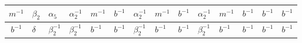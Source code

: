 \documentclass{llncs}
\begin{document}
\begin{table}[h]
\begin{center}
\begin{tabular}{|c|p{0.7cm}|p{0.7cm}|p{0.7cm}|p{0.7cm}|p{0.7cm}|p{0.7cm}|p{0.7cm}|p{0.7cm}|p{0.7cm}|p{0.7cm}|p{0.7cm}|p{0.7cm}|p{0.7cm}|}
\hline
\cellcolor{gray!8}$m^{-1}$ & \cellcolor{blue!20}$\beta_2$ & $\alpha_5$ & \cellcolor{yellow!30}$\alpha_2^{-1}$ &\cellcolor{yellow!30} $m^{-1}$ & \cellcolor{yellow!30}$b^{-1}$ & \cellcolor{yellow!30}$\alpha_2^{-1}$ & \cellcolor{yellow!30}$m^{-1}$ & \cellcolor{yellow!30}$b^{-1}$ & \cellcolor{yellow!30}$\alpha_2^{-1}$ & \cellcolor{yellow!30}$m^{-1}$ & \cellcolor{yellow!30}$b^{-1}$ & \cellcolor{yellow!30}$b^{-1}$ & \cellcolor{yellow!30}$b^{-1}$ \\
\hline
\cellcolor{gray!8}$b^{-1}$ & $\delta$ & \cellcolor{yellow!30}$\beta_2^{-1}$ & \cellcolor{yellow!30}$\beta_2^{-1}$ & \cellcolor{yellow!30}$b^{-1}$ & \cellcolor{yellow!30}$b^{-1}$ & \cellcolor{yellow!30}$\beta_2^{-1}$ & \cellcolor{yellow!30}$b^{-1}$ & \cellcolor{yellow!30}$b^{-1}$ &\cellcolor{yellow!30} $\beta_2^{-1}$ & \cellcolor{yellow!30}$b^{-1}$ & \cellcolor{yellow!30}$b^{-1}$ & \cellcolor{yellow!30}$b^{-1}$ & \cellcolor{yellow!30}$b^{-1}$ \\
\hline
\end{tabular}
\end{center}
\end{table}
\end{document}
